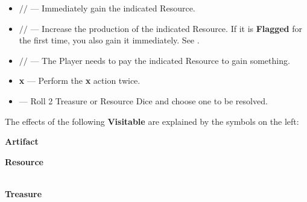 \begin{multicols*}{2}
\medskip

\begin{itemize}[itemsep=0.4em]
  \item [{\LARGE$\boldsymbol{+}$}]
    $\boldsymbol{/}$$\boldsymbol{/}$ —
    Immediately gain the indicated Resource.
  \item [{\svg[14]{ongoing}}]
    $\boldsymbol{/}$$\boldsymbol{/}$ —
    Increase the production of the indicated Resource.
    If it is \textbf{Flagged} for the first time, you also gain it immediately. See .
  \item [{\svg[10]{pay_v2}}]
    $\boldsymbol{/}$$\boldsymbol{/}$  —
    The Player needs to pay the indicated Resource to gain something.
  \item [{\LARGE\textbf{2}}] {\LARGE\textbf{x}} —
    Perform the {\LARGE\textbf{x}} action twice.
  \item [{\LARGE\textbf{2}}]    —
    Roll 2 Treasure or Resource Dice and choose one to be resolved.
\end{itemize}

\columnbreak


The effects of the following \textbf{Visitable}  are explained by the symbols on the left:

\medskip

{\centering
  \phantom{j}\textbf{Artifact}\\

  \bigskip

  \phantom{j}\textbf{Resource}\\
  \\

  \bigskip

  \phantom{j}\textbf{Treasure}\\
  \\
}
\end{multicols*}

